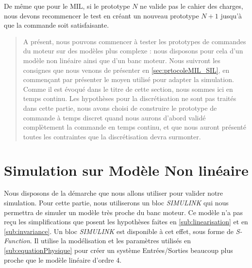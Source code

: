 	De même que pour le MIL, si le prototype $N$ ne valide pas le cahier des charges, nous devons recommencer le test en créant un nouveau prototype $N+1$ jusqu'à que la commande soit satisfaisante. 
	\begin{abstract}
	A présent, nous pouvons commencer à tester les prototypes de commandes du moteur sur des modèles plus complexe : nous disposons pour cela d'un modèle non linéaire ainsi que d'un banc moteur. Nous suivront les consignes que nous venons de présenter en \ref{sec:prtocoleMIL_SIL}, en commençant par présenter le moyen utilisé pour adapter la simulation. 
	Comme il est évoqué dans le titre de cette section, nous sommes ici en temps continu. Les hypothèses pour la discrétisation ne sont pas traités dans cette partie, nous avons choisi de construire le prototype de commande à temps discret quand nous aurons d'abord validé complètement la commande en temps continu, et que nous auront présenté toutes les contraintes que la discrétisation devra surmonter. 
	\end{abstract}
	\section{Simulation sur Modèle Non linéaire}
		
		Nous disposons de la démarche que nous allons utiliser pour valider notre simulation. Pour cette partie, nous utiliserons un bloc \emph{SIMULINK} qui nous permettra de simuler un modèle très proche du banc moteur. Ce modèle n'a pas reçu les simplifications que posent les hypothèses faites en \ref{sub:linearisation} et en \ref{sub:invariance}. Un bloc \emph{SIMULINK} est disponible à cet effet, sous forme de \emph{S-Function}. Il utilise la modélisation et les paramètres utilisés en \ref{sub:equationPhysique} pour créer un système Entrées/Sorties beaucoup plus proche que le modèle linéaire d'ordre 4. 
